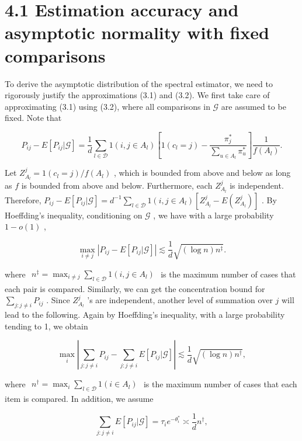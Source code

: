 \section{4.1 Estimation accuracy and asymptotic normality with fixed
comparisons}\label{estimation-accuracy-and-asymptotic-normality-with-fixed-comparisons}

To derive the asymptotic distribution of the spectral estimator, we need
to rigorously justify the approximations (3.1) and (3.2). We first take
care of approximating (3.1) using (3.2), where all comparisons in
\(\mathcal{G}\) are assumed to be fixed. Note that

\[
P_{ij} - E[P_{ij}|\mathcal{G}] = \frac{1}{d}\sum_{l\in \mathcal{D}}1(i,j\in A_l)\left[1(c_l = j) - \frac{\pi_j^*}{\sum_{u\in A_l}\pi_u^*}\right]\frac{1}{f(A_l)}.
\]

Let \(Z_{A_l}^j = 1(c_l = j) / f(A_l)\) , which is bounded from above
and below as long as \(f\) is bounded from above and below. Furthermore,
each \(Z_{A_l}^j\) is independent. Therefore,
\(P_{ij} - E[P_{ij}|\mathcal{G}] = d^{- 1}\sum_{l\in \mathcal{D}}1(i,j\in A_l)[Z_{A_l}^j - E(Z_{A_l}^j)]\)
. By Hoeffding's inequality, conditioning on \(\mathcal{G}\) , we have
with a large probability \(1 - o(1)\) ,

\[
\max_{i\neq j}\left|P_{ij} - E[P_{ij}|\mathcal{G}]\right|\lesssim \frac{1}{d}\sqrt{(\log n)n^{\ddagger}}.
\]

where
\(\begin{array}{r}{n^{\ddagger} = \max_{i\neq j}\sum_{l\in \mathcal{D}}1(i,j\in A_{l})} \end{array}\)
is the maximum number of cases that each pair is compared. Similarly, we
can get the concentration bound for
\(\textstyle \sum_{j:j\neq i}P_{ij}\) . Since \(Z_{A_{l}}^{j}\) 's are
independent, another level of summation over \(j\) will lead to the
following. Again by Hoeffding's inequality, with a large probability
tending to 1, we obtain

\[
\max_{i}\left|\sum_{j:j\neq i}P_{ij} - \sum_{j:j\neq i}E[P_{ij}|\mathcal{G}]\right|\lesssim \frac{1}{d}\sqrt{(\log n)n^{\dagger}},
\]

where
\(\begin{array}{r}{n^{\dagger} = \max_{i}\sum_{l\in \mathcal{D}}1(i\in A_{l})} \end{array}\)
is the maximum number of cases that each item is compared. In addition,
we assume

\[
\sum_{j:j\neq i}E[P_{ij}|\mathcal{G}] = \tau_{i}e^{-\theta_{i}^{*}}\asymp \frac{1}{d} n^{\dagger},
\]

